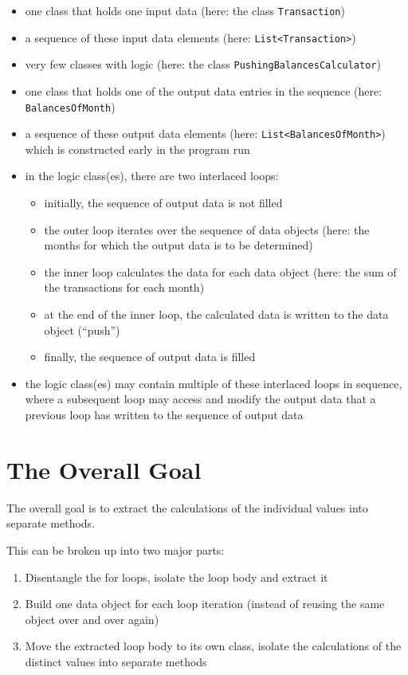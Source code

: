 \documentclass[a4paper,fleqn,titlepage,11pt]{article}
\begin{document}
\begin{itemize}
\item one class that holds one input data (here: the class \texttt{Transaction})
\item a sequence of these input data elements (here: \texttt{List<Transaction>})
\item very few classes with logic (here: the class \texttt{PushingBalancesCalculator})
\item one class that holds one of the output data entries in the sequence (here: \texttt{BalancesOfMonth})
\item a sequence of these output data elements (here: \texttt{List<BalancesOfMonth>}) which is constructed early in the program run
\item in the logic class(es), there are two interlaced loops: 
\begin{itemize}
\item initially, the sequence of output data is not filled
\item the outer loop iterates over the sequence of data objects (here: the months for which the output data is to be determined)
\item the inner loop calculates the data for each data object (here: the sum of the transactions for each month)
\item at the end of the inner loop, the calculated data is written to the data object (``push'')
\item finally, the sequence of output data is filled
\end{itemize}
\item the logic class(es) may contain multiple of these interlaced loops in sequence, where a subsequent loop may access and modify the output data that a previous loop has written to the sequence of output data
\end{itemize}

\section{The Overall Goal}

The overall goal is to extract the calculations of the individual values into separate methods.

This can be broken up into two major parts:

\begin{enumerate}
\item Disentangle the for loops, isolate the loop body and extract it
\item Build one data object for each loop iteration (instead of reusing the same object over and over again)

\item Move the extracted loop body to its own class, isolate the calculations of the distinct values into separate methods
\end{enumerate}
\end{document}
